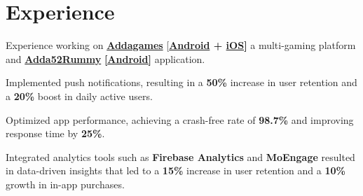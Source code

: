 \documentclass[]{deedy-resume-openfont}
\begin{document}
%
%
\lastupdated

%
%

%
%

\begin{minipage}[t]{0.66\textwidth} 



\section{Experience}
\vspace{\topsep} %
\begin{tightemize}
\item Experience working on \href{https://www.adda.games}{\bf Addagames} [{\bf  \href{https://www.adda.games}{\bf Android} + \href{https://apps.apple.com/in/app/addagames/id1565328482}{\bf iOS}]} a multi-gaming platform and \href{https://play.google.com/store/apps/details?id=com.addagames.rummy}{\bf Adda52Rummy}  \href{https://play.google.com/store/apps/details?id=com.addagames.rummy}{\bf [Android]}  application.
\item Implemented push notifications, resulting in a {\bf 50\%} increase in user retention and a {\bf 20\%} boost in daily active users.
\item Optimized app performance, achieving a crash-free rate of {\bf 98.7\%} and improving response time by {\bf 25\%}.
\item Integrated analytics tools such as {\bf Firebase Analytics} and {\bf MoEngage} resulted in data-driven insights that led to a {\bf 15\%} increase in user retention and a {\bf 10\%} growth in in-app purchases.
\end{tightemize}
\sectionsep
\sectionsep


\end{minipage}
\end{document}
